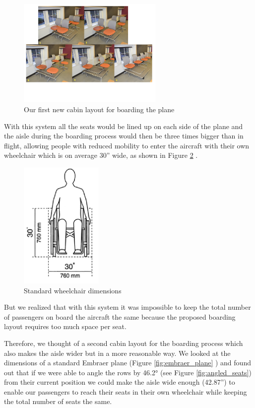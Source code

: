 \begin{figure}[h]
  \centering
     \includegraphics[width=7cm]{images/first_new_cabin_layout.png}
   \caption{Our first new cabin layout for boarding the plane}
  \label{fig:first_new_cabin_layout}
\end{figure} 

With this system all the seats would be lined up on each side of the plane and the aisle during the boarding process would then be three times bigger than in flight, allowing people with reduced mobility to enter the aircraft with their own wheelchair which is on average 30'' wide, as shown in Figure \ref{fig:wheelchair_dimensions} .

\begin{figure}[h]
  \centering
     \includegraphics[width=4cm]{images/wheelchair_dimensions.png}
   \caption{Standard wheelchair dimensions}
  \label{fig:wheelchair_dimensions}
\end{figure}

But we realized that with this system it was impossible to keep the total number of passengers on board the aircraft the same because the proposed boarding layout requires too much space per seat. 

Therefore, we thought of a second cabin layout for the boarding process which also makes the aisle wider but in a more reasonable way. We looked at the dimensions of a standard Embraer plane (Figure \ref{fig:embraer_plane} ) and found out that if we were able to angle the rows by 46.2° (see Figure \ref{fig:angled_seats}) from their current position we could make the aisle wide enough (42.87'') to enable our passengers to reach their seats in their own wheelchair while keeping the total number of seats the same.

